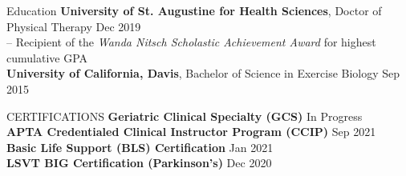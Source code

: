 \documentclass{resume} %
\begin{document}
\vspace{-15pt}
\begin{rSection}{Education}
\textbf{University of St. Augustine for Health Sciences}, Doctor of Physical Therapy \hfill {Dec 2019}
\\
\-\hspace{5mm} -- Recipient of the \textit{Wanda Nitsch Scholastic Achievement Award} for highest cumulative GPA
\\
\textbf{University of California, Davis}, Bachelor of Science in Exercise Biology \hfill {Sep 2015}
\end{rSection}


\begin{rSection}{CERTIFICATIONS}
\textbf{Geriatric Clinical Specialty (GCS)} \hfill In Progress\\
\textbf{APTA Credentialed Clinical Instructor Program (CCIP)} \hfill Sep 2021\\
\textbf{Basic Life Support (BLS) Certification} \hfill Jan 2021\\
\textbf{LSVT BIG Certification (Parkinson's)} \hfill Dec 2020
\end{rSection}
\end{document}
